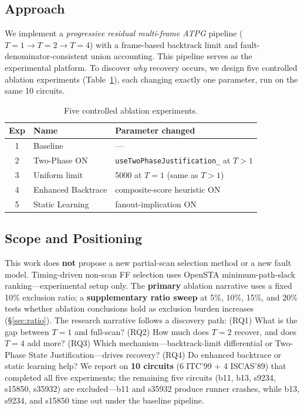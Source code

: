\documentclass[conference]{IEEEtran}
\begin{document}
\subsection{Approach}
We implement a \emph{progressive residual multi-frame ATPG} pipeline
($T{=}1{\rightarrow}T{=}2{\rightarrow}T{=}4$) with a frame-based backtrack
limit and fault-denominator-consistent union accounting. This pipeline serves
as the experimental platform. To discover \emph{why} recovery occurs, we design
five controlled ablation experiments (Table~\ref{tab:exp-design}), each changing
exactly one parameter, run on the same 10 circuits.

\begin{table}[t]
\caption{Five controlled ablation experiments.}
\label{tab:exp-design}
\centering
\footnotesize
\begin{tabular}{@{}clp{3.6cm}@{}}
\toprule
Exp & Name & Parameter changed \\
\midrule
1 & Baseline & --- \\
2 & Two-Phase ON & \texttt{useTwoPhaseJustification\_} at $T{>}1$ \\
3 & Uniform limit & 5000 at $T{=}1$ (same as $T{>}1$) \\
4 & Enhanced Backtrace & composite-score heuristic ON \\
5 & Static Learning & fanout-implication ON \\
\bottomrule
\end{tabular}
\end{table}

\subsection{Scope and Positioning}
This work does \textbf{not} propose a new partial-scan selection method or a new
fault model. Timing-driven non-scan FF selection uses OpenSTA
minimum-path-slack ranking---experimental setup only. The \textbf{primary}
ablation narrative uses a fixed 10\% exclusion ratio; a \textbf{supplementary
ratio sweep} at 5\%, 10\%, 15\%, and 20\% tests whether ablation conclusions
hold as exclusion burden increases (\S\ref{sec:ratio}). The research narrative
follows a discovery path: (RQ1) What is the gap between $T{=}1$ and full-scan?
(RQ2) How much does $T{=}2$ recover, and does $T{=}4$ add more? (RQ3) Which
mechanism---backtrack-limit differential or Two-Phase State Justification---drives
recovery? (RQ4) Do enhanced backtrace or static learning help? We report on
\textbf{10 circuits} (6 ITC'99 + 4 ISCAS'89) that completed all five experiments;
the remaining five circuits (b11, b13, s9234, s15850, s35932) are excluded---b11
and s35932 produce runner crashes, while b13, s9234, and s15850 time out under
the baseline pipeline.
\end{document}
